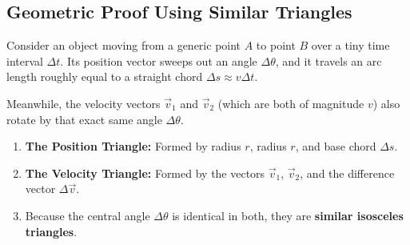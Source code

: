\documentclass{article}
\begin{document}
\subsection{Geometric Proof Using Similar Triangles}
Consider an object moving from a generic point $A$ to point $B$ over a tiny time interval $\Delta t$. Its position vector sweeps out an angle $\Delta \theta$, and it travels an arc length roughly equal to a straight chord $\Delta s \approx v \Delta t$.

Meanwhile, the velocity vectors $\vec{v}_1$ and $\vec{v}_2$ (which are both of magnitude $v$) also rotate by that exact same angle $\Delta \theta$.

\begin{enumerate}
    \item \textbf{The Position Triangle:} Formed by radius $r$, radius $r$, and base chord $\Delta s$.
    \item \textbf{The Velocity Triangle:} Formed by the vectors $\vec{v}_1$, $\vec{v}_2$, and the difference vector $\Delta \vec{v}$.
    \item Because the central angle $\Delta \theta$ is identical in both, they are \textbf{similar isosceles triangles}.
\end{enumerate}
\end{document}

